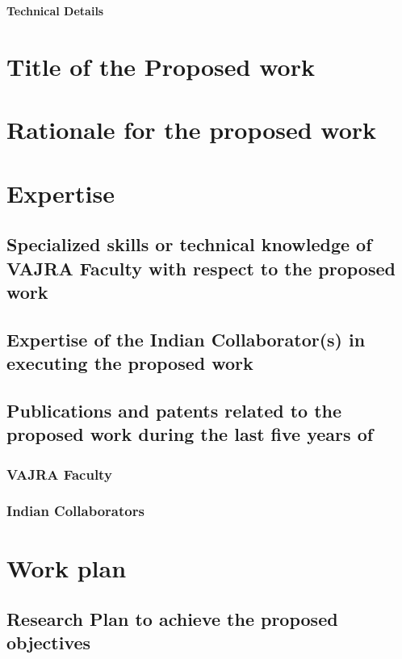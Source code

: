 \documentclass[twoside]{article}
\begin{document}
\begin{center}
\bf{\LARGE{Technical Details}}
\end{center}
\section{Title of the  Proposed work}

\section{Rationale for the proposed work}%

\section{Expertise}
\subsection{Specialized skills or technical knowledge of VAJRA Faculty with respect to the proposed work}

\subsection{Expertise of the Indian Collaborator(s) in executing the proposed work}

\subsection{Publications and patents related to the proposed work during the last five years of}
\subsubsection{VAJRA Faculty}

\subsubsection{Indian Collaborators}


\section{Work plan}
\subsection{Research Plan to achieve the proposed objectives}
\end{document}
